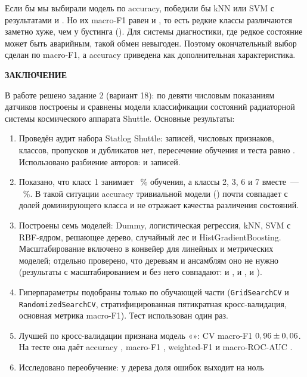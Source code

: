 \documentclass[14pt,a4paper]{extarticle}
\newcommand{\struct}[1]{%
  \clearpage
  \begin{center}\bfseries #1\end{center}%
  \addcontentsline{toc}{section}{#1}%
}
\begin{document}
Если бы мы выбирали модель по accuracy, победили бы kNN или SVM
с результатами \AccKnn{} и \AccSvm. Но их macro-F1 равен \FOneKnn{} и
\FOneSvm, то есть редкие классы различаются заметно хуже, чем
у бустинга (\FOneHgb). Для системы диагностики, где редкое состояние
может быть аварийным, такой обмен невыгоден. Поэтому окончательный
выбор сделан по macro-F1, а accuracy приведена как дополнительная
характеристика.

\struct{ЗАКЛЮЧЕНИЕ}

В работе решено задание 2 (вариант 18): по девяти числовым показаниям
датчиков построены и сравнены модели классификации состояний радиаторной
системы космического аппарата Shuttle. Основные результаты:

\begin{enumerate}
  \item Проведён аудит набора Statlog Shuttle: \NTotal{} записей,
  \NFeatures{} числовых признаков, \NClasses{} классов, пропусков и
  дубликатов нет, пересечение обучения и теста равно \NOverlap.
  Использовано разбиение авторов: \NTrain{} и \NTest{} записей.
  \item Показано, что класс 1 занимает \ShareMajorTrain~\% обучения,
  а классы 2, 3, 6 и 7 вместе~--- \ShareMinorTrain~\%. В такой ситуации
  accuracy тривиальной модели (\AccDummy) почти совпадает с долей
  доминирующего класса и не отражает качества различения состояний.
  \item Построены семь моделей: Dummy, логистическая регрессия, kNN,
  SVM с RBF-ядром, решающее дерево, случайный лес и
  HistGradientBoosting. Масштабирование включено в конвейер для линейных
  и метрических моделей; отдельно проверено, что деревьям и ансамблям
  оно не нужно (результаты с масштабированием и без него совпадают:
  \ScaleTreeRaw{} и \ScaleTreeScaled, \ScaleRfRaw{} и \ScaleRfScaled,
  \ScaleHgbRaw{} и \ScaleHgbScaled).
  \item Гиперпараметры подобраны только по обучающей части
  (\texttt{GridSearchCV} и \texttt{RandomizedSearchCV},
  стратифицированная пятикратная кросс-валидация, основная метрика
  macro-F1). Тест использован один раз.
  \item Лучшей по кросс-валидации признана модель «\BestName»:
  CV macro-F1 $0,96 \pm 0,06$. На тесте она даёт accuracy
  \BestAcc, macro-F1 \BestFOne, weighted-F1 \BestWf{} и macro-ROC-AUC
  \BestAuc.
  \item Исследовано переобучение: у дерева доля ошибок выходит на ноль

\end{enumerate}
\end{document}
